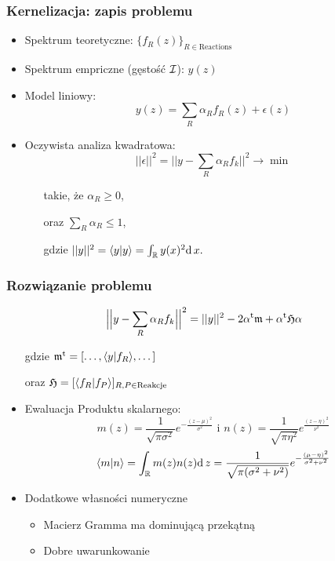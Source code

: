 \documentclass[xetex]{beamer}
\begin{document}
	\begin{frame}\frametitle{Kernelizacja: zapis problemu}

		\begin{itemize}
			\item 	Spektrum teoretyczne: $\Big\{ f_R(z) \Big\}_{R \in \text{Reactions}}$
			\item 	Spektrum empriczne (gęstość $\mathcal{I}$): $y(z)$
			\item 	Model liniowy:
			$$ y(z) = \sum_{R} \alpha_R f_R (z) + \epsilon(z)$$
			\item 	Oczywista analiza kwadratowa:
			$$ ||\epsilon||^2 = \Big|\Big| y - \sum_{R} \alpha_R f_k \Big|\Big|^2 \rightarrow \min$$
			\begin{itemize}
				\item[takie, że] $\alpha_R \geq 0$,
				\item[oraz] $\sum_R \alpha_R \leq 1$,
				\item[gdzie] $ ||y||^2 = \langle y|y \rangle =  \int_{\mathbb{R}} y(x)^2 \mathrm{d}\,x.$ 
			\end{itemize}
		\end{itemize}
	\end{frame}

	\begin{frame}\frametitle{Rozwiązanie problemu}

		$$ \Big|\Big| y - \sum_{R} \alpha_R f_k \Big|\Big|^2 = || y ||^2 - 2 \alpha^{\mathrm{t}} \mathfrak{m} + \alpha^{\mathrm{t}} \mathfrak{H} \alpha$$ 

		\begin{itemize}
			\item[gdzie] $\mathfrak{m}^{\mathrm{t}} = [ \dots, \langle y|f_R \rangle, \dots ]$
			\item[oraz] $\mathfrak{H} = [\langle f_R|f_P \rangle]_{R,P \in \text{Reakcje}}$
			\item[] 			
			\item 	Ewaluacja Produktu skalarnego:
			$$ m(z) = \frac{1}{\sqrt{\pi \sigma^2}} e^{-\frac{(z-\mu)^2}{\sigma^2}}\text{ i } 
n(z) = \frac{1}{\sqrt{\pi \eta^2}} e^{\frac{(z-\eta)^2}{\nu^2}}
$$
			$$\langle m|n \rangle = \int_{\mathbb{R}} m(z)n(z) \mathrm{d}\,z  = \frac{1}{\sqrt{\pi (\sigma^2 + \nu^2)}}e^{-\frac{(\mu-\eta)^2}{\sigma^2+\nu^2}}$$  
			\item 	Dodatkowe własności numeryczne
			\begin{itemize}
				\item 	Macierz Gramma ma dominującą przekątną
				\item  	Dobre uwarunkowanie
			\end{itemize}
		\end{itemize}

	\end{frame}
\end{document}
